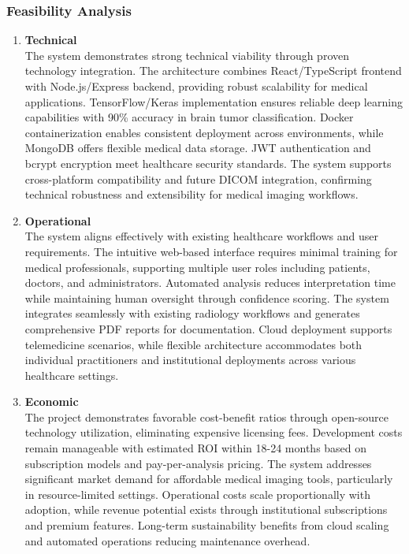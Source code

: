 \subsubsection{Feasibility Analysis}
\begin{enumerate}[label=\roman*.]
    \item \textbf{Technical} \\
          The system demonstrates strong technical viability through proven technology integration. The architecture combines React/TypeScript frontend with Node.js/Express backend, providing robust scalability for medical applications. TensorFlow/Keras implementation ensures reliable deep learning capabilities with 90\% accuracy in brain tumor classification. Docker containerization enables consistent deployment across environments, while MongoDB offers flexible medical data storage. JWT authentication and bcrypt encryption meet healthcare security standards. The system supports cross-platform compatibility and future DICOM integration, confirming technical robustness and extensibility for medical imaging workflows.

    \item \textbf{Operational} \\
          The system aligns effectively with existing healthcare workflows and user requirements. The intuitive web-based interface requires minimal training for medical professionals, supporting multiple user roles including patients, doctors, and administrators. Automated analysis reduces interpretation time while maintaining human oversight through confidence scoring. The system integrates seamlessly with existing radiology workflows and generates comprehensive PDF reports for documentation. Cloud deployment supports telemedicine scenarios, while flexible architecture accommodates both individual practitioners and institutional deployments across various healthcare settings.
    \item \textbf{Economic} \\
          The project demonstrates favorable cost-benefit ratios through open-source technology utilization, eliminating expensive licensing fees. Development costs remain manageable with estimated ROI within 18-24 months based on subscription models and pay-per-analysis pricing. The system addresses significant market demand for affordable medical imaging tools, particularly in resource-limited settings. Operational costs scale proportionally with adoption, while revenue potential exists through institutional subscriptions and premium features. Long-term sustainability benefits from cloud scaling and automated operations reducing maintenance overhead.


\end{enumerate}
